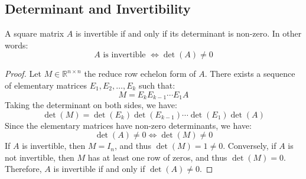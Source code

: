\subsection{Determinant and Invertibility}
\begin{theorem}
    A square matrix \(A\) is invertible if and only if its determinant is non-zero. In other words:
    \[
        A \text{ is invertible } \iff \det(A) \neq 0
    \]
\end{theorem}
\begin{proof}
    Let $M \in \mathbb{R}^{n \times n}$ the reduce row echelon form of $A$. There exists a sequence of elementary matrices \(E_1, E_2, \ldots, E_k\) such that:
    \[
        M = E_k E_{k-1} \cdots E_1 A
    \]
    Taking the determinant on both sides, we have:
    \[
        \det(M) = \det(E_k) \det(E_{k-1}) \cdots \det(E_1) \det(A)
    \]
    Since the elementary matrices have non-zero determinants, we have:
    \[
        \det(A) \neq 0 \iff \det(M) \neq 0
    \]
    If $A$ is invertible, then $M = I_n$, and thus \(\det(M) = 1 \neq 0\). Conversely, if \(A\) is not invertible, then \(M\) has at least one row of zeros, and thus \(\det(M) = 0\). Therefore, \(A\) is invertible if and only if \(\det(A) \neq 0\).
\end{proof}

